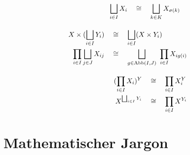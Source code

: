 \begin{align*}
\begin{split}
    \bigsqcup_{i\in I} X_i & \quad\cong\quad \bigsqcup_{k\in K} X_{\sigma(k)}
    \end{split} \\[1em]
    \begin{split}
        X \times (\bigsqcup_{i\in I} Y_i) & \quad\cong\quad \bigsqcup_{i\in I} (X\times Y_i) \\
        \prod_{i\in I} \bigsqcup_{j\in J} X_{ij} & \quad\cong\quad \bigsqcup_{g\in \operatorname{Abb}(I,J)}\ \prod_{i\in I} X_{ig(i)}
    \end{split} \\[1em]
    \begin{split}
        (\prod_{i\in I} X_i)^Y & \quad\cong\quad \prod_{i\in I} X_i^Y \\
        X^{\bigsqcup_{i\in I} Y_i} & \quad\cong\quad \prod_{i\in I} X^{Y_i}
    \end{split}
\end{align*}
\endgroup





\chapter{Mathematischer Jargon}


